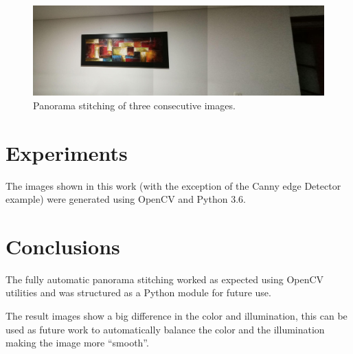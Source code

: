\documentclass[journal]{IEEEtran}
\begin{document}
\begin{figure}
\includegraphics[scale=0.08]{../img/stitch2}
\caption{Panorama stitching of three consecutive images.}
\label{stitching-many}
\end{figure}

\section{Experiments}

The images shown in this work (with the exception of the Canny edge Detector
example) were generated using OpenCV and Python 3.6.

\section{Conclusions}

The fully automatic panorama stitching worked as expected using OpenCV utilities
and was structured as a Python module for future use.

The result images show a big difference in the color and illumination, this can
be used as future work to automatically balance the color and the illumination
making the image more ``smooth''.





\end{document}
